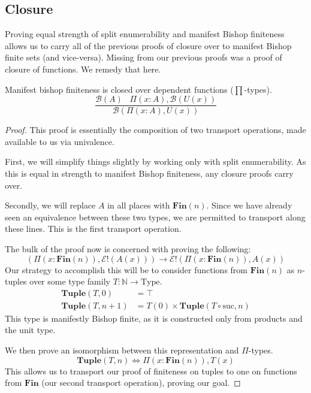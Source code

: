 \subsection{Closure}
Proving equal strength of split enumerability and manifest Bishop finiteness
allows us to carry all of the previous proofs of closure over to manifest Bishop
finite sets (and vice-versa).
Missing from our previous proofs was a proof of closure of functions.
We remedy that here.
\begin{rm-theorem}
  Manifest bishop finiteness is closed over dependent functions
  (\(\prod\)-types).
  \begin{equation}
    \frac{
      \mathcal{B}(A) \; \; \; \Pi {(x : A)} , \mathcal{B}\left( U(x) \right)
    }{
      \mathcal{B}\left(\Pi {(x : A)} , U(x)\right)
    }
  \end{equation}
\end{rm-theorem}
\begin{proof}
  This proof is essentially the composition of two transport operations, made
  available to us via univalence.
  
  First, we will simplify things slightly by working only with split
  enumerability.
  As this is equal in strength to manifest Bishop finiteness, any closure proofs
  carry over.

  Secondly, we will replace \(A\) in all places with \(\mathbf{Fin}(n)\).
  Since we have already seen an equivalence between these two types, we are
  permitted to transport along these lines.
  This is the first transport operation.

  The bulk of the proof now is concerned with proving the following:
  \begin{equation}
    \left( \Pi {(x : \mathbf{Fin}(n))} , \mathcal{E}!(A(x)) \right) \rightarrow \mathcal{E}!\left( \Pi {(x : \mathbf{Fin}(n))} , A(x) \right)
  \end{equation}
  Our strategy to accomplish this will be to consider functions from
  \(\mathbf{Fin}(n)\) as \(n\)-tuples over some type family \(T : \mathbb{N}
  \rightarrow \text{Type}\).
  \begin{equation}
    \begin{aligned}
      \mathbf{Tuple}(T, 0)   &= \top \\
      \mathbf{Tuple}(T, n+1) &= T(0) \times \mathbf{Tuple}(T \circ \text{suc}, n)
    \end{aligned}
  \end{equation}
  This type is manifestly Bishop finite, as it is constructed only from products
  and the unit type.
  
  We then prove an isomorphism between this representation and \(\Pi\)-types.
  \begin{equation}
    \mathbf{Tuple}(T, n) \iff \Pi {(x : \mathbf{Fin}(n))} , T(x)
  \end{equation}
  This allows us to transport our proof of finiteness on tuples to one on
  functions from \(\mathbf{Fin}\) (our second transport operation), proving our
  goal.
\end{proof}
